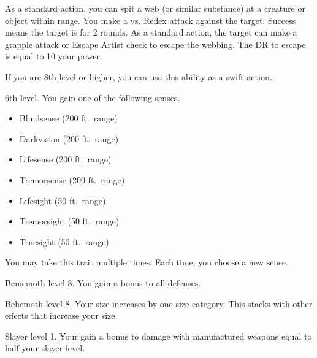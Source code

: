     \featben As a standard action, you can spit a web (or similar substance) at a creature or object within \rngmed range.
    You make a  vs. Reflex attack against the target.
    Success means the target is \immobilized for 2 rounds.
    As a standard action, the target can make a grapple attack or Escape Artist check to escape the webbing.
    The DR to escape is equal to 10 \add your power.

    If you are 8th level or higher, you can use this ability as a swift action.

    \featpre 6th level.
    \featben You gain one of the following senses.
    \begin{itemize}
        \item Blindsense (200 ft.\ range)
        \item Darkvision (200 ft.\ range)
        \item Lifesense (200 ft.\ range)
        \item Tremorsense (200 ft.\ range)
        \item Lifesight (50 ft.\ range)
        \item Tremorsight (50 ft.\ range)
        \item Truesight (50 ft.\ range)
    \end{itemize}
     You may take this trait multiple times.
    Each time, you choose a new sense.

    \featpre Bememoth level 8.
    \featben You gain a  bonus to all defenses.

    \featpre Behemoth level 8.
    \featben Your size increases by one size category.
    This stacks with other effects that increase your size.

    \featpre Slayer level 1.
    \featben Your gain a bonus to damage with manufactured weapons equal to half your slayer level.
